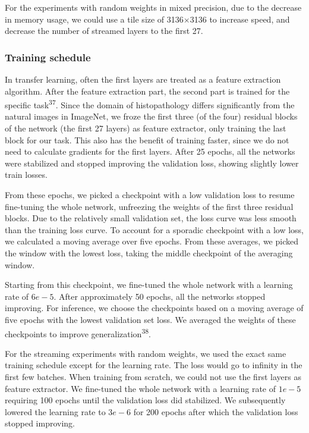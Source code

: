 \documentclass[
  12pt,
  a5,margin=2cmpaper,
]{article}
\begin{document}
For the experiments with random weights in mixed precision, due to the
decrease in memory usage, we could use a tile size of 3136\(\times\)3136
to increase speed, and decrease the number of streamed layers to the
first 27.

\hypertarget{training-schedule}{%
\subsubsection{Training schedule}\label{training-schedule}}

In transfer learning, often the first layers are treated as a feature
extraction algorithm. After the feature extraction part, the second part
is trained for the specific task\textsuperscript{37}. Since the domain
of histopathology differs significantly from the natural images in
ImageNet, we froze the first three (of the four) residual blocks of the
network (the first 27 layers) as feature extractor, only training the
last block for our task. This also has the benefit of training faster,
since we do not need to calculate gradients for the first layers. After
25 epochs, all the networks were stabilized and stopped improving the
validation loss, showing slightly lower train losses.

From these epochs, we picked a checkpoint with a low validation loss to
resume fine-tuning the whole network, unfreezing the weights of the
first three residual blocks. Due to the relatively small validation set,
the loss curve was less smooth than the training loss curve. To account
for a sporadic checkpoint with a low loss, we calculated a moving
average over five epochs. From these averages, we picked the window with
the lowest loss, taking the middle checkpoint of the averaging window.

Starting from this checkpoint, we fine-tuned the whole network with a
learning rate of \(6e-5\). After approximately 50 epochs, all the
networks stopped improving. For inference, we choose the checkpoints
based on a moving average of five epochs with the lowest validation set
loss. We averaged the weights of these checkpoints to improve
generalization\textsuperscript{38}.

For the streaming experiments with random weights, we used the exact
same training schedule except for the learning rate. The loss would go
to infinity in the first few batches. When training from scratch, we
could not use the first layers as feature extractor. We fine-tuned the
whole network with a learning rate of \(1e-5\) requiring 100 epochs
until the validation loss did stabilized. We subsequently lowered the
learning rate to \(3e-6\) for 200 epochs after which the validation loss
stopped improving.
\end{document}
